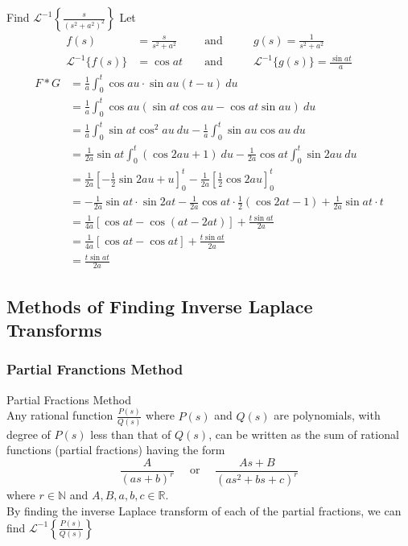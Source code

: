 \documentclass[12pt]{article}
\newcommand{\Lapinv}{\mathscr{L}^{-1}}
\begin{document}
\begin{example}{Find $\displaystyle \Lapinv \left\{ \frac{s}{(s^2+a^2)^2} \right\}$}{}
    Let 
    \begin{align*}
        f(s) &= \frac{s}{s^2+a^2} &&\text{ and } &&&g(s) = \frac{1}{s^2+a^2} \\
        \Lapinv \{ f(s) \} &= \cos{at} &&\text{ and } &&&\Lapinv \{ g(s) \} = \frac{\sin{at}}{a}
    \end{align*}
    \begin{align*}
        F*G &= \frac{1}{a}\int_{0}^{t} {\cos{au} \cdot \sin{au(t-u)}} \: d{u} \\
        &= \frac{1}{a} \int_{0}^{t} {\cos{au} (\sin{at}\cos{au} - \cos{at}\sin{au})} \: d{u} \\
        &= \frac{1}{a}\int_{0}^{t} {\sin{at}\cos^2{au}} \: d{u} - \frac{1}{a}\int_{0}^{t} {\sin{au}\cos{au}} \: d{u} \\
        &= \frac{1}{2a}\sin{at}\int_{0}^{t} {(\cos{2au}+1)} \: d{u} - \frac{1}{2a}\cos{at}\int_{0}^{t} {\sin{2au}} \: d{u} \\
        &= \frac{1}{2a} \left[ -\frac{1}{2}\sin{2au} + u \right]_0^t - \frac{1}{2a} \left[ \frac{1}{2}\cos{2au} \right]_0^t \\
        &= -\frac{1}{2a}\sin{at}\cdot\sin{2at} - \frac{1}{2a}\cos{at}\cdot\frac{1}{2}(\cos{2at}-1) + \frac{1}{2a}\sin{at}\cdot t \\
        &= \frac{1}{4a} \left[ \cos{at} - \cos{(at - 2at)} \right] + \frac{t\sin{at}}{2a} \\
        &= \frac{1}{4a} \left[ \cos{at} - \cos{at} \right] + \frac{t\sin{at}}{2a} \\
        &= \frac{t\sin{at}}{2a}
    \end{align*}
\end{example}


\subsection{Methods of Finding Inverse Laplace Transforms}

\subsubsection{Partial Franctions Method}

\begin{theorem}{Partial Fractions Method}{}
    \\Any rational function $\displaystyle \frac{P(s)}{Q(s)}$ where $P(s)$ and $Q(s)$ are polynomials, with degree of  $P(s)$ less than that of $Q(s)$, can be written as the sum of rational functions (partial fractions) having the form
    \[
        \frac{A}{(as + b)^r} \quad \text{ or } \quad \frac{As + B}{(as^2 + bs + c)^r}
    \]
    where $r \in \mathbb{N}$ and $A, B, a, b, c \in \mathbb{R}$.\\
    By finding the inverse Laplace transform of each of the partial fractions, we can find $\displaystyle \Lapinv \left\{ \frac{P(s)}{Q(s)} \right\}$
\end{theorem}
\end{document}
